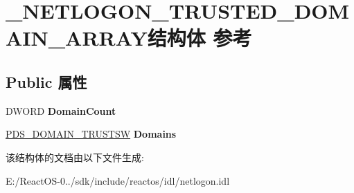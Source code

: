 \hypertarget{struct___n_e_t_l_o_g_o_n___t_r_u_s_t_e_d___d_o_m_a_i_n___a_r_r_a_y}{}\section{\+\_\+\+N\+E\+T\+L\+O\+G\+O\+N\+\_\+\+T\+R\+U\+S\+T\+E\+D\+\_\+\+D\+O\+M\+A\+I\+N\+\_\+\+A\+R\+R\+A\+Y结构体 参考}
\label{struct___n_e_t_l_o_g_o_n___t_r_u_s_t_e_d___d_o_m_a_i_n___a_r_r_a_y}
\subsection*{Public 属性}
\begin{DoxyCompactItemize}
\item 
\mbox{\label{struct___n_e_t_l_o_g_o_n___t_r_u_s_t_e_d___d_o_m_a_i_n___a_r_r_a_y_a6dc363592be3c436e2e39b081de479fb}} 
D\+W\+O\+RD {\bfseries Domain\+Count}
\item 
\mbox{\label{struct___n_e_t_l_o_g_o_n___t_r_u_s_t_e_d___d_o_m_a_i_n___a_r_r_a_y_ae31cbc5602df364293bc1539159d4008}} 
\hyperlink{struct___d_s___d_o_m_a_i_n___t_r_u_s_t_s_w}{P\+D\+S\+\_\+\+D\+O\+M\+A\+I\+N\+\_\+\+T\+R\+U\+S\+T\+SW} {\bfseries Domains}
\end{DoxyCompactItemize}


该结构体的文档由以下文件生成\+:\begin{DoxyCompactItemize}
\item 
E\+:/\+React\+O\+S-\/0../sdk/include/reactos/idl/netlogon.\+idl\end{DoxyCompactItemize}
